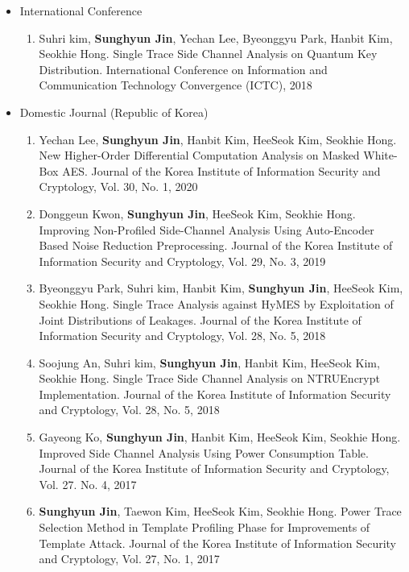 \documentclass[a4paper,20pt]{article}
\begin{document}
\begin{itemize}
    \item {International Conference}
        \vspace{-6pt}
        \begin{enumerate}
            \item {Suhri kim, \textbf{Sunghyun Jin}, Yechan Lee, Byeonggyu Park, Hanbit Kim, Seokhie Hong. Single Trace Side Channel Analysis on Quantum Key Distribution. International Conference on Information and Communication Technology Convergence (ICTC), 2018}
            \vspace{-2pt}
        \end{enumerate}
        
    \item {Domestic Journal (Republic of Korea)}
        \vspace{-6pt}
        \begin{enumerate}
            \item {Yechan Lee, \textbf{Sunghyun Jin}, Hanbit Kim, HeeSeok Kim, Seokhie Hong. New Higher-Order Differential Computation Analysis on Masked White-Box AES. Journal of the Korea Institute of Information Security and Cryptology, Vol. 30, No. 1, 2020}
            \vspace{-2pt}
            \item {Donggeun Kwon, \textbf{Sunghyun Jin}, HeeSeok Kim, Seokhie Hong. Improving Non-Profiled Side-Channel Analysis Using Auto-Encoder Based Noise Reduction Preprocessing. Journal of the Korea Institute of Information Security and Cryptology, Vol. 29, No. 3, 2019}
            \vspace{-2pt}
            \item {Byeonggyu Park, Suhri kim, Hanbit Kim, \textbf{Sunghyun Jin}, HeeSeok Kim, Seokhie Hong. Single Trace Analysis against HyMES by Exploitation of Joint Distributions of Leakages. Journal of the Korea Institute of Information Security and Cryptology, Vol. 28, No. 5, 2018}
            \vspace{-2pt}
            \item {Soojung An, Suhri kim, \textbf{Sunghyun Jin}, Hanbit Kim, HeeSeok Kim, Seokhie Hong. Single Trace Side Channel Analysis on NTRUEncrypt Implementation. Journal of the Korea Institute of Information Security and Cryptology, Vol. 28, No. 5, 2018}
            \vspace{-2pt}
            \item {Gayeong Ko, \textbf{Sunghyun Jin}, Hanbit Kim, HeeSeok Kim, Seokhie Hong. Improved Side Channel Analysis Using Power Consumption Table. Journal of the Korea Institute of Information Security and Cryptology, Vol. 27. No. 4, 2017}
            \vspace{-2pt}
            \item {\textbf{Sunghyun Jin}, Taewon Kim, HeeSeok Kim, Seokhie Hong. Power Trace Selection Method in Template Profiling Phase for Improvements of Template Attack. Journal of the Korea Institute of Information Security and Cryptology, Vol. 27, No. 1, 2017}
            \vspace{-2pt}
        \end{enumerate}
        

\end{itemize}
\end{document}
